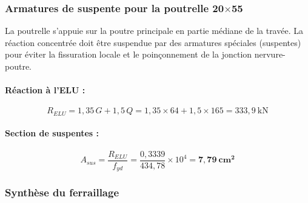 \subsubsection{Armatures de suspente pour la poutrelle 20\texorpdfstring{$\times$}{x}55}

La poutrelle s'appuie sur la poutre principale en partie médiane de la travée. La réaction concentrée doit être suspendue par des armatures spéciales (suspentes) pour éviter la fissuration locale et le poinçonnement de la jonction nervure-poutre.

\paragraph{Réaction à l'ELU :}
\[
  R_{ELU} = 1{,}35\,G + 1{,}5\,Q = 1{,}35 \times 64 + 1{,}5 \times 165 = 333{,}9~\text{kN}
\]

\paragraph{Section de suspentes :}
\[
  A_{sus} = \frac{R_{ELU}}{f_{yd}} = \frac{0{,}3339}{434{,}78} \times 10^4 = \mathbf{7{,}79~\text{cm}^2}
\]


\subsubsection{Synthèse du ferraillage}


